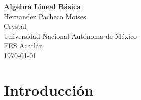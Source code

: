 \documentclass[a4paper,12pt]{report} %
\begin{document}
\begin{titlepage}
    \pagecolor{MidnightBlue}
    \color{white}
    \centering
    {\Huge \textbf{Algebra Lineal Básica}} \\[2.5cm] %
    {\Large Hernandez Pacheco Moises} \\[0.5cm]       %
    {\Large Crystal} \\[2.5cm]       %
    {\Large Universidad Nacional Autónoma de México} \\[0.5cm]   %
    {\Large FES Acatlán} \\[0.5cm]   %
    \vfill
    {\large \today}                              %
\end{titlepage}

\pagecolor{white}
\color{black}

\tableofcontents %

\newpage
\chapter{\large Introducción}
\lipsum[1-3] %
\end{document}
